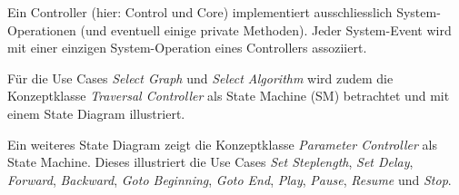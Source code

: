 Ein Controller (hier: Control und Core) implementiert ausschliesslich System-Operationen (und eventuell einige private Methoden). Jeder System-Event wird mit einer einzigen System-Operation eines Controllers assoziiert.

F\"ur die Use Cases \textit{Select Graph} und \textit{Select Algorithm} wird zudem die Konzeptklasse \textit{Traversal Controller} als State Machine (SM) betrachtet und mit einem State Diagram illustriert.

Ein weiteres State Diagram zeigt die Konzeptklasse \textit{Parameter Controller} als State Machine. Dieses illustriert die Use Cases \textit{Set Steplength}, \textit{Set Delay}, \textit{Forward}, \textit{Backward}, \textit{Goto Beginning}, \textit{Goto End}, \textit{Play}, \textit{Pause}, \textit{Resume} und \textit{Stop}.